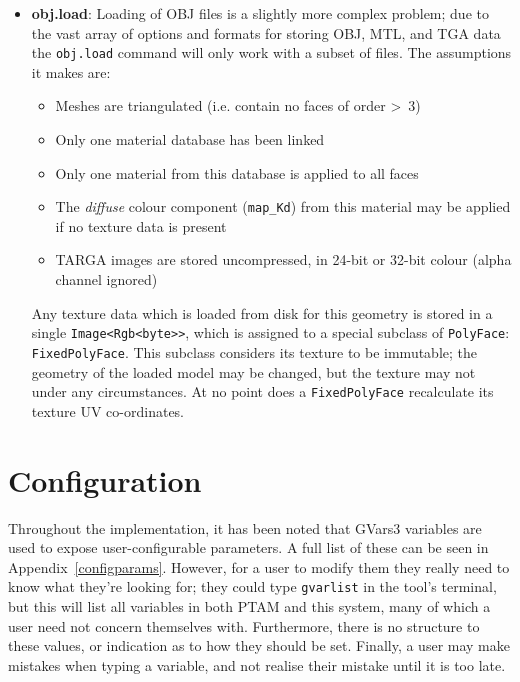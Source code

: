 \documentclass[a4paper,10pt]{report}
\begin{document}
\begin{itemize}
\item{\textbf{obj.load}: Loading of OBJ files is a slightly more complex problem; due to the vast array of options and formats for storing OBJ, MTL, and TGA data the \texttt{obj.load} command will only work with a subset of files. The assumptions it makes are:
\begin{itemize}
\item{Meshes are triangulated (i.e. contain no faces of order \textgreater~3)}
\item{Only one material database has been linked}
\item{Only one material from this database is applied to all faces}
\item{The \textit{diffuse} colour component (\texttt{map\_Kd}) from this material may be applied if no texture data is present}
\item{TARGA images are stored uncompressed, in 24-bit or 32-bit colour (alpha channel ignored)}
\end{itemize}

Any texture data which is loaded from disk for this geometry is stored in a single \texttt{Image\textless Rgb\textless byte\textgreater \textgreater}, which is assigned to a special subclass of \texttt{PolyFace}: \texttt{FixedPolyFace}. This subclass considers its texture to be immutable; the geometry of the loaded model may be changed, but the texture may not under any circumstances. At no point does a \texttt{FixedPolyFace} recalculate its texture UV co-ordinates.
}
\end{itemize}

\section{Configuration}
Throughout the implementation, it has been noted that GVars3 variables are used to expose user-configurable parameters. A full list of these can be seen in Appendix~\ref{configparams}. However, for a user to modify them they really need to know what they're looking for; they could type \texttt{gvarlist} in the tool's terminal, but this will list all variables in both PTAM and this system, many of which a user need not concern themselves with. Furthermore, there is no structure to these values, or indication as to how they should be set. Finally, a user may make mistakes when typing a variable, and not realise their mistake until it is too late.
\end{document}
